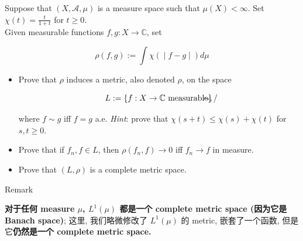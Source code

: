 Suppose that \((X,\mathcal{A},\mu)\) is a measure space such that \(\mu(X) < \infty\). Set \(\chi(t) = \frac{t}{1 + t}\) for \(t \geq 0\).\\
Given measurable functions \(f,g:X\rightarrow\mathbb{C}\), set

\[\left. \rho(f,g) := \int\chi( \middle| f - g \middle| ) d\mu \right.\]

\begin{itemize}
\item
  Prove that \(\rho\) induces a metric, also denoted \(\rho\), on the space

  \[L := \left\{ {f:X\rightarrow\mathbb{C}\ \text{measurable}} \right\}/\mspace{-18mu}\mspace{-18mu} \sim ,\]

  where \(f \sim g\) iff \(f = g\) a.e. \emph{Hint}: prove that \(\chi(s + t) \leq \chi(s) + \chi(t)\) for \(s,t \geq 0\).
\item
  Prove that if \(f_{n},f \in L\), then \(\rho(f_{n},f)\rightarrow 0\) iff \(f_{n}\rightarrow f\) in measure.
\item
  Prove that \((L,\rho)\) is a complete metric space.
\end{itemize}

\begin{qlremark}{Remark}

\textbf{对于任何 measure \(\mu\), \(L^{1}(\mu)\) 都是一个 complete metric space (因为它是 Banach space)}; 这里, 我们略微修改了 \(L^{1}(\mu)\) 的 metric, 嵌套了一个函数, 但是它\textbf{仍然是一个 complete metric space.}

\end{qlremark}

